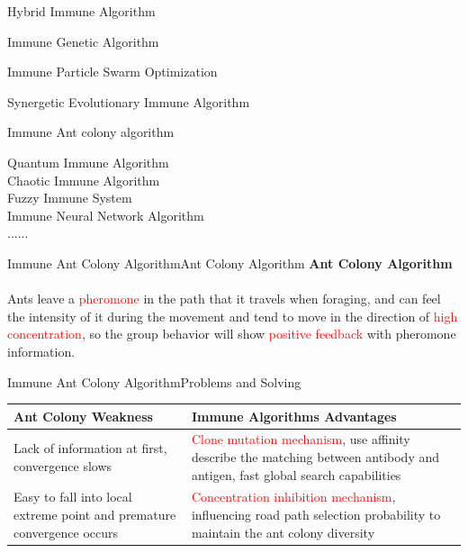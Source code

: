 \begin{frame}{Hybrid Immune Algorithm}
\begin{itemize}\large{
\item{Immune Genetic Algorithm}
\item{Immune Particle Swarm Optimization}
\item{Synergetic Evolutionary Immune Algorithm}
\item{Immune Ant colony algorithm}
\item{
Quantum Immune Algorithm\\
Chaotic Immune Algorithm\\
Fuzzy Immune System\\
Immune Neural Network Algorithm\\
......
}}
\end{itemize}
\small
{\noindent

}
\end{frame}

\begin{frame}{Immune Ant Colony Algorithm}{Ant Colony Algorithm}
 \huge \textbf{Ant Colony Algorithm}\\~\\
 \large
 {
Ants leave a \textcolor{red}{pheromone} in the path that it travels when foraging, and can feel the intensity of it during the movement and tend to move in the direction of \textcolor{red}{high concentration}, so the  group behavior will show \textcolor{red}{positive feedback} with pheromone information.
 }\\
\end{frame}

\begin{frame}{Immune Ant Colony Algorithm}{Problems and Solving}
\begin{table}
\begin{tabular}{p{11em}|p{19em}}
\toprule
\textbf{Ant Colony Weakness} & \textbf{Immune Algorithms Advantages}\\
\midrule \small
\footnotesize{Lack of information at first, convergence slows} & \footnotesize{ \textcolor{red}{Clone mutation mechanism}, use affinity describe the matching between antibody and antigen, fast global search capabilities}\\
\footnotesize{Easy to fall into local extreme point and premature convergence occurs} & \footnotesize{ \textcolor{red}{Concentration inhibition mechanism}, influencing road path selection probability to maintain the ant colony diversity} \\
\bottomrule
\end{tabular}
\end{table}
\end{frame}

